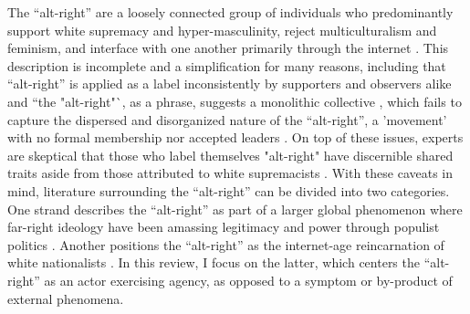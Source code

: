 \documentclass[acmlarge, screen, authorversion]{acmart}
\begin{document}
The ``alt-right” are a loosely connected group of individuals who predominantly support white supremacy and hyper-masculinity, reject multiculturalism and feminism, and interface with one another primarily through the internet
\cite{sternProudBoysWhite2019, mainRiseAltRight2018, nagleKillAllNormies2017, hawleyMakingSenseAltright2017}.
This description is incomplete and a simplification for
many reasons, including that ``alt-right'' is applied as a label inconsistently by supporters and observers alike \cite{hawleyMakingSenseAltright2017} and ``the "alt-right"`, as a phrase, suggests a monolithic collective \cite{massanariRethinkingResearchEthics2018}, which fails to capture the dispersed and disorganized \cite{martinDissectingTrumpMost2017} nature of the ``alt-right'', a 'movement' with no formal membership nor accepted leaders \cite{hawleyMakingSenseAltright2017}. On top of these issues, experts are skeptical that those who label themselves "alt-right" have discernible shared traits aside from those attributed to white supremacists
\cite{gallaherMainstreamingWhiteSupremacy2020, johndaniszewskiWritingAltright2016}.  With these caveats in mind, literature surrounding the ``alt-right” can be divided into two categories. One strand describes the ``alt-right'' as part
of a larger global phenomenon where far-right ideology have been
amassing legitimacy and power through populist politics \cite{cammaertsMainstreamingExtremeRightWing2018, worthMorbidSymptomsGlobal2019}. Another positions the
``alt-right” as the internet-age reincarnation of white nationalists
\cite{hawleyMakingSenseAltright2017, mainRiseAltRight2018}. In this review,
I focus on the latter, which centers the ``alt-right'' as an actor exercising agency, as opposed to a symptom or by-product of external phenomena.
\end{document}
